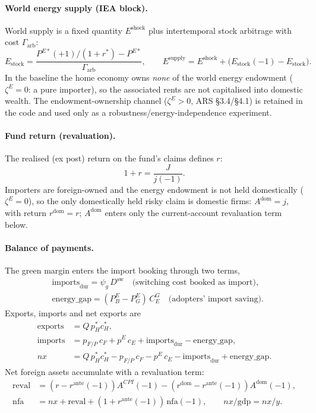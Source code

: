 \documentclass[11pt,a4paper]{article}
\newcommand{\dsw}{D^{\mathrm{sw}}}
\newcommand{\PEB}{P^{E}_{B}}
\newcommand{\PEG}{P^{E}_{G}}
\newcommand{\pE}{p^{E}}
\begin{document}
\paragraph{World energy supply (IEA block).} World supply is a fixed quantity
$E^{\text{shock}}$ plus intertemporal stock arbitrage with cost $\Gamma_{\text{arb}}$:
\begin{equation}
E_{\text{stock}} = \frac{P^{E*}(+1)/(1+r^{*})-P^{E*}}{\Gamma_{\text{arb}}},\qquad
E^{\text{supply}} = E^{\text{shock}}+\bigl(E_{\text{stock}}(-1)-E_{\text{stock}}\bigr).
\end{equation}
In the baseline the home economy owns \emph{none} of the world energy endowment
($\zeta^{E}=0$: a pure importer), so the associated rents are not capitalised
into domestic wealth. The endowment-ownership channel ($\zeta^{E}>0$, ARS
\S3.4/\S4.1) is retained in the code and used only as a robustness/energy-independence
experiment.

\paragraph{Fund return (revaluation).} The realised (ex post) return on the
fund's claims defines $r$:
\begin{equation}
1+r=\frac{J}{j(-1)}.
\end{equation}
Importers are foreign-owned and the energy endowment is not held domestically
($\zeta^{E}=0$), so the only domestically held risky claim is domestic firms:
$A^{\text{dom}}=j$, with return $r^{\text{dom}}=r$; $A^{\text{dom}}$ enters only
the current-account revaluation term below.

\paragraph{Balance of payments.}\label{sec:bop}
The green margin enters the import booking through two terms,
\begin{align}
&\text{imports}_{\text{dur}}=\psi_g\,\dsw
\quad\text{(switching cost booked as import)},\\
&\text{energy\_gap}=(\PEB-\PEG)\,C^{G}_{E}
\quad\text{(adopters' import saving)}.
\end{align}
Exports, imports and net exports are
\begin{align}
\text{exports}&=Q\,p_H^{*}c_H^{*},\\
\text{imports}&=p_{F/P}\,c_F+\pE\,c_E+\text{imports}_{\text{dur}}-\text{energy\_gap},\\
nx&=Q\,p_H^{*}c_H^{*}-p_{F/P}\,c_F-\pE\,c_E-\text{imports}_{\text{dur}}+\text{energy\_gap}.
\end{align}
Net foreign assets accumulate with a revaluation term:
\begin{align}
\text{reval} &= (r-r^{\text{ante}}(-1))A^{CPI}(-1)-(r^{\text{dom}}-r^{\text{ante}}(-1))A^{\text{dom}}(-1),\\
\mathrm{nfa} &= nx+\text{reval}+(1+r^{\text{ante}}(-1))\,\mathrm{nfa}(-1),
\qquad nx/\mathrm{gdp}=nx/y. \label{eq:nfa}
\end{align}
\end{document}
